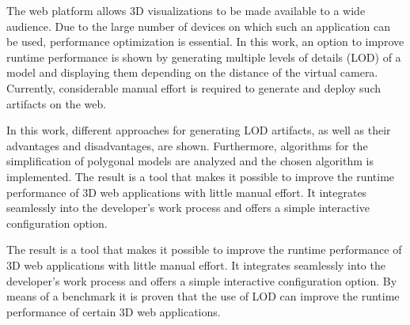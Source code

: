 The web platform allows 3D visualizations to be made available to a wide audience. Due to the large number of devices on which such an application can be used, performance optimization is essential. In this work, an option to improve runtime performance is shown by generating multiple levels of details (LOD) of a model and displaying them depending on the distance of the virtual camera. Currently, considerable manual effort is required to generate and deploy such artifacts on the web.

\bigbreak
In this work, different approaches for generating LOD artifacts, as well as their advantages and disadvantages, are shown.
Furthermore, algorithms for the simplification of polygonal models are analyzed and the chosen algorithm is implemented.
The result is a tool that makes it possible to improve the runtime performance of 3D web applications with little manual effort.
It integrates seamlessly into the developer's work process and offers a simple interactive configuration option.

\bigbreak
The result is a tool that makes it possible to improve the runtime performance of 3D web applications with little manual effort.
It integrates seamlessly into the developer's work process and offers a simple interactive configuration option.
By means of a benchmark it is proven that the use of LOD can improve the runtime performance of certain 3D web applications.


